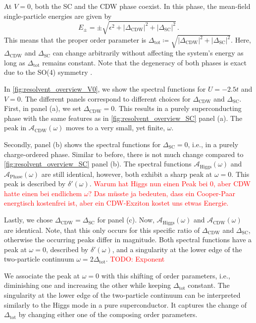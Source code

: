 \documentclass[
    reprint, 
    aps,
    preprintnumbers,
    twocolumn,
    prb,
    superscriptaddress
]{revtex4-2}
\newcommand{\spectral}[1]{\mathcal{A}_\text{#1}  (\omega)}
\begin{document}
At $V=0$, both the SC and the CDW phase coexist. 
In this phase, the mean-field single-particle energies are given by
\begin{equation}
    E_{\pm} = \pm \sqrt{\epsilon^2 + |\Delta_\text{CDW}|^2 + |\Delta_\text{SC}|^2}\,.
\end{equation}
This means that the proper order parameter is $\Delta_\text{tot} \coloneqq \sqrt{|\Delta_\text{CDW}|^2 + |\Delta_\text{SC}|^2}$.
Here, $\Delta_\text{CDW}$ and $\Delta_\text{SC}$ can change arbitrarily without affecting the system's energy as long as $\Delta_\text{tot}$ remains constant.
Note that the degeneracy of both phases is exact due to the SO(4) symmetry \cite{yang90}. 

In \autoref{fig:resolvent_overview_V0}, we show the spectral functions for $U=-2.5t$ and $V=0$.
The different panels correspond to different choices for $\Delta_\text{CDW}$ and $\Delta_\text{SC}$.
First, in panel (a), we set $\Delta_\text{CDW} = 0$.
This results in a purely superconducting phase with the same features as in \autoref{fig:resolvent_overview_SC} panel (a).
The peak in $\spectral{CDW}$ moves to a very small, yet finite, $\omega$.

Secondly, panel (b) shows the spectral functions for $\Delta_\text{SC} = 0$, i.e., in a purely charge-ordered phase.
Similar to before, there is not much change compared to \autoref{fig:resolvent_overview_SC} panel (b).
The spectral functions $\spectral{Higgs}$ and $\spectral{Phase}$ are still identical, however, both exhibit a sharp peak at $\omega=0$.
This peak is described by $\delta'(\omega)$.
\textcolor{red}{Warum hat Higgs nun einen Peak bei 0, aber CDW hatte einen bei endlichem $\omega$? Das müsste ja bedeuten, dass ein Cooper-Paar energtisch kostenfrei ist, aber ein CDW-Exziton kostet uns etwas Energie.}

Lastly, we chose $\Delta_\text{CDW} = \Delta_\text{SC}$ for panel (c).
Now, $\spectral{Higgs}$ and $\spectral{CDW}$ are identical.
Note, that this only occurs for this specific ratio of $\Delta_\text{CDW}$ and $\Delta_\text{SC}$, otherwise the occurring peaks differ in magnitude.
Both spectral functions have a peak at $\omega = 0$, described by $\delta'(\omega)$, and a singularity at the lower edge of the two-particle continuum $\omega = 2\Delta_\text{tot}$.
\textcolor{red}{TODO: Exponent}

We associate the peak at $\omega=0$ with this shifting of order parameters, i.e., diminishing one and increasing the other while keeping $\Delta_\text{tot}$ constant.
The singularity at the lower edge of the two-particle continuum can be interpreted similarly to the Higgs mode in a pure superconductor.
It captures the change of $\Delta_\text{tot}$ by changing either one of the composing order parameters.
\end{document}

